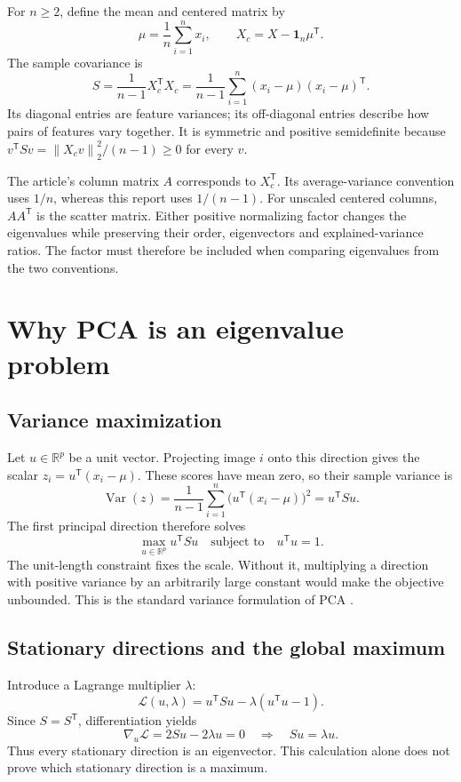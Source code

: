 \documentclass[11pt,a4paper,english]{article}
\numberwithin{equation}{section}
\newcommand{\R}{\mathbb{R}}
\newcommand{\norm}[1]{\left\lVert#1\right\rVert}
\newcommand{\T}{^{\mathsf T}}
\begin{document}
For $n\geq2$, define the mean and centered matrix by
\begin{equation}
\mu=\frac1n\sum_{i=1}^{n}x_i,
\qquad X_c=X-\mathbf1_n\mu\T.
\label{eq:center}
\end{equation}
The sample covariance is
\begin{equation}
S=\frac{1}{n-1}X_c\T X_c
=\frac{1}{n-1}\sum_{i=1}^n(x_i-\mu)(x_i-\mu)\T.
\label{eq:cov}
\end{equation}
Its diagonal entries are feature variances; its off-diagonal entries describe how pairs of features vary together. It is symmetric and positive semidefinite because
$v\T Sv=\norm{X_cv}_2^2/(n-1)\geq0$ for every $v$.

The article's column matrix $A$ corresponds to $X_c\T$. Its average-variance convention uses $1/n$, whereas this report uses $1/(n-1)$. For unscaled centered columns, $AA\T$ is the scatter matrix. Either positive normalizing factor changes the eigenvalues while preserving their order, eigenvectors and explained-variance ratios. The factor must therefore be included when comparing eigenvalues from the two conventions.

\section{Why PCA is an eigenvalue problem}
\subsection{Variance maximization}
Let $u\in\R^p$ be a unit vector. Projecting image $i$ onto this direction gives the scalar $z_i=u\T(x_i-\mu)$. These scores have mean zero, so their sample variance is
\begin{equation}
\operatorname{Var}(z)=\frac1{n-1}\sum_{i=1}^n\bigl(u\T(x_i-\mu)\bigr)^2
=u\T Su.
\label{eq:variance}
\end{equation}
The first principal direction therefore solves
\begin{equation}
\max_{u\in\R^p} u\T Su
\quad\text{subject to}\quad u\T u=1.
\label{eq:objective}
\end{equation}
The unit-length constraint fixes the scale. Without it, multiplying a direction with positive variance by an arbitrarily large constant would make the objective unbounded. This is the standard variance formulation of PCA \cite{jolliffe}.

\subsection{Stationary directions and the global maximum}
Introduce a Lagrange multiplier $\lambda$:
\begin{equation}
\mathcal L(u,\lambda)=u\T Su-\lambda(u\T u-1).
\end{equation}
Since $S=S\T$, differentiation yields
\begin{equation}
\nabla_u\mathcal L=2Su-2\lambda u=0
\quad\Longrightarrow\quad Su=\lambda u.
\label{eq:eigen}
\end{equation}
Thus every stationary direction is an eigenvector. This calculation alone does not prove which stationary direction is a maximum.
\end{document}
